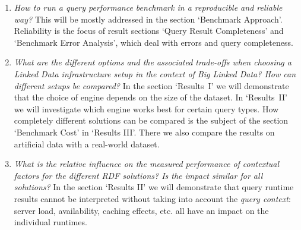 \begin{enumerate}
\item \textit{How to run a query performance benchmark in a reproducible and reliable way?}
This will be mostly addressed in the section `Benchmark Approach'. Reliability is the focus of result sections `Query Result Completeness' and `Benchmark Error Analysis', 
which deal with errors and query completeness. 

\item \textit{What are the different options and the associated trade-offs when choosing a Linked Data infrastructure setup in the context of Big Linked Data? How can different setups be compared? }
In the section `Results~I' we will demonstrate that the choice of engine depends on the size of the dataset. In `Results~II' we will investigate which engine works best for certain query types. How completely different solutions can be compared is the subject of the section `Benchmark Cost' in `Results III'. There we also compare the results on artificial data with a real-world dataset.

\item \textit{What is the relative influence on the measured performance of contextual factors for the different RDF solutions? Is the impact similar for all solutions?}
In the section `Results II' we will demonstrate that query runtime results cannot be interpreted without taking into account the \emph{query context}: server load, availability, caching effects, etc. all have an impact on the individual runtimes.


\end{enumerate}